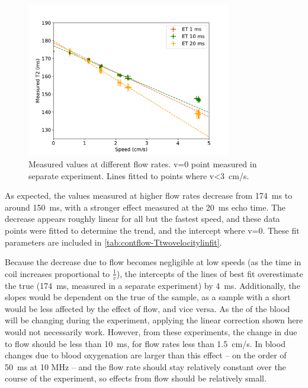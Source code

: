 \begin{figure}[t]
\centering
\includegraphics[width=0.8\textwidth]{figures/contflow/T2velocity.pdf}
\caption[Measured \Ttwo values at different flow rates]{Measured \Ttwo values at different flow rates. v=0 point measured in separate experiment. Lines fitted to points where v\SI{<3}{cm/s}.}
\label{fig:contflow-Ttwovelocity}
\end{figure}

As expected, the \Ttwo values measured at higher flow rates decrease from \SI{174}{ms} to around \SI{150}{ms}, with a stronger effect measured at the \SI{20}{ms} echo time.
The decrease appears roughly linear for all but the fastest speed, and these data points were fitted to determine the trend, and the intercept where v=0.
These fit parameters are included in \autoref{tab:contflow-Ttwovelocitylinfit}.

Because the \Ttwo decrease due to flow becomes negligible at low speeds (as the time in coil increases proportional to $\frac{1}{\mathit{v}}$), the intercepts of the lines of best fit overestimate the true \Ttwo (\SI{174}{ms}, measured in a separate experiment) by \SI{4}{ms}.
Additionally, the slopes would be dependent on the true \Ttwo of the sample, as a sample with a short \Ttwo would be less affected by the effect of flow, and vice versa.
As the \Ttwo of the blood will be changing during the experiment, applying the linear correction shown here would not necessarily work.
However, from these experiments, the change in \Ttwo due to flow should be less than \SI{10}{ms}, for flow rates less than \SI{1.5}{cm/s}.
In blood \Ttwo changes due to blood oxygenation are larger than this effect -- on the order of \SI{50}{ms} at 10 MHz -- and the flow rate should stay relatively constant over the course of the experiment, so effects from flow should be relatively small.

